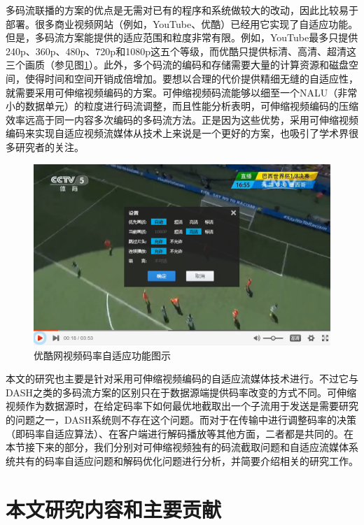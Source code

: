 多码流联播的方案的优点是无需对已有的程序和系统做较大的改动，因此比较易于部署\supercite{Bouten2014}。很多商业视频网站（例如，YouTube、优酷）已经用它实现了自适应功能。但是，多码流方案能提供的适应范围和粒度非常有限。例如，YouTube最多只提供240p、360p、480p、720p和1080p这五个等级，而优酷只提供标清、高清、超清这三个画质（参见图\ref{fig:13}）。此外，多个码流的编码和存储需要大量的计算资源和磁盘空间，使得时间和空间开销成倍增加。要想以合理的代价提供精细无缝的自适应性，就需要采用可伸缩视频编码的方案。可伸缩视频码流能够以细至一个NALU（非常小的数据单元）的粒度进行码流调整，而且性能分析表明，可伸缩视频编码的压缩效率远高于同一内容多次编码的多码流方法\supercite{SVC-Performance}。正是因为这些优势，采用可伸缩视频编码来实现自适应视频流媒体从技术上来说是一个更好的方案，也吸引了学术界很多研究者的关注\supercite{Chuah2012, Zhu2013, Dan2013, Yang2014, Cicalo2014}。

\begin{figure}[h]
	\centering
	\includegraphics[width = 0.9\linewidth]{clip/13.png}
	\caption{优酷网视频码率自适应功能图示\label{fig:13}}
\end{figure}

本文的研究也主要是针对采用可伸缩视频编码的自适应流媒体技术进行。不过它与DASH之类的多码流方案的区别只在于数据源端提供码率改变的方式不同。可伸缩视频作为数据源时，在给定码率下如何最优地截取出一个子流用于发送是需要研究的问题之一，DASH系统则不存在这个问题。而对于在传输中进行调整码率的决策（即码率自适应算法）、在客户端进行解码播放等其他方面，二者都是共同的。在本节接下来的部分，我们分别对可伸缩视频独有的码流截取问题和自适应流媒体系统共有的码率自适应问题和解码优化问题进行分析，并简要介绍相关的研究工作。

\section{本文研究内容和主要贡献}

